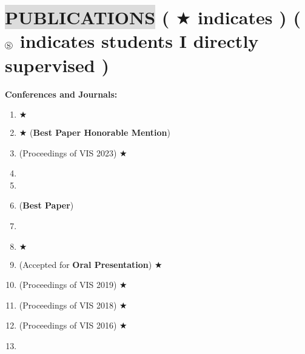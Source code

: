 \section*{
    \colorbox{gainsboro}{PUBLICATIONS}  {\small \normalfont ( \footnotesize $\bigstar$ \small indicates  ) ( $\circledS$ indicates students I directly supervised )}
}
    

\textbf{Conferences and Journals:}
\vspace{-3mm}
\begin{enumerate}[leftmargin=5mm]
    \item {} \footnotesize $\bigstar$ \small
    \item {} \footnotesize $\bigstar$ \small (\textbf{Best Paper Honorable Mention})
    \item {} (Proceedings of VIS 2023) \footnotesize $\bigstar$ \small
    \item {}
    \item {}
    \item {} (\textbf{Best Paper})
    \item {}
    \item {} \footnotesize $\bigstar$ \small
    \item {} (Accepted for \textbf{Oral Presentation}) \footnotesize $\bigstar$ \small
    \item {} (Proceedings of VIS 2019) \footnotesize $\bigstar$ \small
    \item {} (Proceedings of VIS 2018) \footnotesize $\bigstar$ \small
    \item {} (Proceedings of VIS 2016) \footnotesize $\bigstar$ \small
    \item {}
\end{enumerate}

